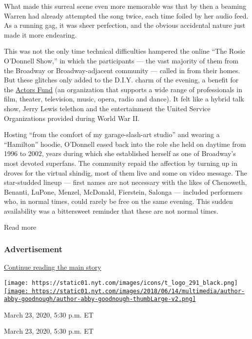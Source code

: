 What made this surreal scene even more memorable was that by then a
beaming Warren had already attempted the song twice, each time foiled by
her audio feed. As a running gag, it was sheer perfection, and the
obvious accidental nature just made it more endearing.

This was not the only time technical difficulties hampered the online
``The Rosie O'Donnell Show,'' in which the participants --- the vast
majority of them from the Broadway or Broadway-adjacent community ---
called in from their homes. But these glitches only added to the D.I.Y.
charm of the evening, a benefit for the
\href{https://actorsfund.org/}{Actors Fund} (an organization that
supports a wide range of professionals in film, theater, television,
music, opera, radio and dance). It felt like a hybrid talk show, Jerry
Lewis telethon and the entertainment the United Service Organizations
provided during World War II.

Hosting ``from the comfort of my garage-slash-art studio'' and wearing a
``Hamilton'' hoodie, O'Donnell eased back into the role she held on
daytime from 1996 to 2002, years during which she established herself as
one of Broadway's most devoted superfans. The community repaid the
affection by turning up in droves for the virtual shindig, most of them
live and some on video message. The star-studded lineup --- first names
are not necessary with the likes of Chenoweth, Benanti, LuPone, Menzel,
McDonald, Fierstein, Salonga --- included performers who, in normal
times, could rarely be free on the same evening. This sudden
availability was a bittersweet reminder that these are not normal times.

Read more

\hypertarget{advertisement-2}{%
\subsubsection{Advertisement}\label{advertisement-2}}

\protect\hyperlink{after-dfp-ad-mid3}{Continue reading the main story}

\texttt{[image: https://static01.nyt.com/images/icons/t\_logo\_291\_black.png]}\href{https://www.nytimes.com/by/abby-goodnough}{\texttt{[image: https://static01.nyt.com/images/2018/06/14/multimedia/author-abby-goodnough/author-abby-goodnough-thumbLarge-v2.png]}}

March 23, 2020, 5:30 p.m. ET

March 23, 2020, 5:30 p.m. ET

